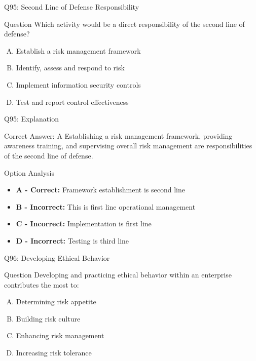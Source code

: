 \documentclass{beamer}
\begin{document}
	\begin{frame}{Q95: Second Line of Defense Responsibility}
		\begin{block}{Question}
			Which activity would be a direct responsibility of the second line of defense?
		\end{block}
		\begin{enumerate}[(A)]
			\item Establish a risk management framework
			\item Identify, assess and respond to risk
			\item Implement information security controls
			\item Test and report control effectiveness
		\end{enumerate}
	\end{frame}
	
	\begin{frame}{Q95: Explanation}
		\begin{block}{Correct Answer: A}
			Establishing a risk management framework, providing awareness training, and supervising overall risk management are responsibilities of the second line of defense.
		\end{block}
		\begin{block}{Option Analysis}
			\begin{itemize}
				\item \textbf{A - Correct:} Framework establishment is second line
				\item \textbf{B - Incorrect:} This is first line operational management
				\item \textbf{C - Incorrect:} Implementation is first line
				\item \textbf{D - Incorrect:} Testing is third line
			\end{itemize}
		\end{block}
	\end{frame}
	
	\begin{frame}{Q96: Developing Ethical Behavior}
		\begin{block}{Question}
			Developing and practicing ethical behavior within an enterprise contributes the most to:
		\end{block}
		\begin{enumerate}[(A)]
			\item Determining risk appetite
			\item Building risk culture
			\item Enhancing risk management
			\item Increasing risk tolerance
		\end{enumerate}
	\end{frame}
	
\end{document}
